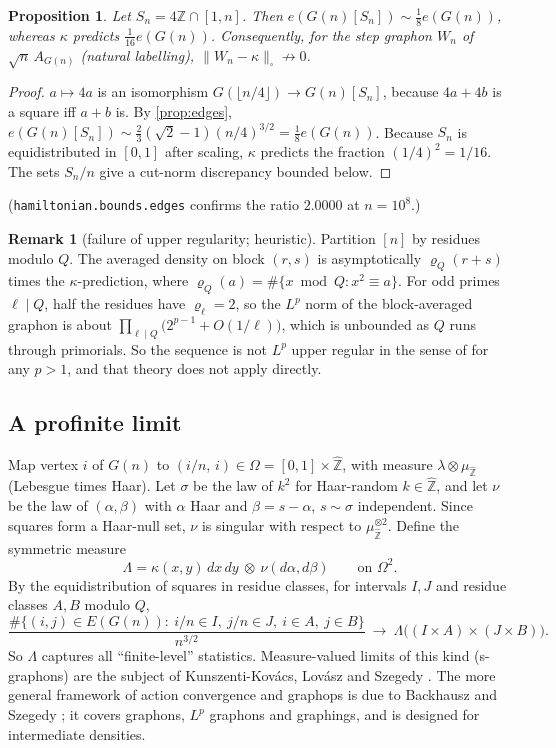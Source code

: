 \documentclass[11pt]{amsart}
\newtheorem{proposition}[theorem]{Proposition}
\theoremstyle{definition}
\newtheorem{remark}[theorem]{Remark}
\newcommand{\Zhat}{\widehat{\mathbb{Z}}}
\begin{document}
\begin{proposition}\label{prop:mod4}
Let $S_n=4\mathbb{Z}\cap[1,n]$. Then $e(G(n)[S_n])\sim\frac18 e(G(n))$, whereas
$\kappa$ predicts $\frac1{16}e(G(n))$. Consequently, for the step graphon $W_n$ of
$\sqrt n\,A_{G(n)}$ (natural labelling), $\|W_n-\kappa\|_\square\not\to0$.
\end{proposition}
\begin{proof}
$a\mapsto 4a$ is an isomorphism $G(\lfloor n/4\rfloor)\to G(n)[S_n]$, because
$4a+4b$ is a square iff $a+b$ is. By \cref{prop:edges},
$e(G(n)[S_n])\sim\frac23(\sqrt2-1)(n/4)^{3/2}=\frac18e(G(n))$. Because $S_n$ is
equidistributed in $[0,1]$ after scaling, $\kappa$ predicts the fraction
$(1/4)^2=1/16$. The sets $S_n/n$ give a cut-norm discrepancy bounded below.
\end{proof}
(\texttt{hamiltonian.bounds.edges} confirms the ratio $2.0000$ at $n=10^8$.)

\begin{remark}[failure of upper regularity; heuristic]
Partition $[n]$ by residues modulo $Q$. The averaged density on block $(r,s)$ is
asymptotically $\varrho_Q(r+s)$ times the $\kappa$-prediction, where
$\varrho_Q(a)=\#\{x\bmod Q:x^2\equiv a\}$. For odd primes $\ell\mid Q$, half the
residues have $\varrho_\ell=2$, so the $L^p$ norm of the block-averaged graphon is about
$\prod_{\ell\mid Q}\bigl(2^{p-1}+O(1/\ell)\bigr)$, which is unbounded as $Q$ runs
through primorials. So the sequence is not $L^p$ upper regular in the sense of
\cite{BCCZ1} for any $p>1$, and that theory does not apply directly.
\end{remark}

\subsection{A profinite limit}
Map vertex $i$ of $G(n)$ to $(i/n,\,i)\in\Omega=[0,1]\times\Zhat$, with measure
$\lambda\otimes\mu_{\Zhat}$ (Lebesgue times Haar). Let $\sigma$ be the law of $k^2$
for Haar-random $k\in\Zhat$, and let $\nu$ be the law of $(\alpha,\beta)$ with $\alpha$
Haar and $\beta=s-\alpha$, $s\sim\sigma$ independent. Since squares form a Haar-null
set, $\nu$ is singular with respect to $\mu_{\Zhat}^{\otimes2}$. Define the symmetric
measure
\[
\Lambda=\kappa(x,y)\,dx\,dy\ \otimes\ \nu(d\alpha,d\beta)\qquad\text{on }\Omega^2 .
\]
By the equidistribution of squares in residue classes, for intervals $I,J$ and residue
classes $A,B$ modulo $Q$,
\[
\frac{\#\{(i,j)\in E(G(n)):\ i/n\in I,\ j/n\in J,\ i\in A,\ j\in B\}}{n^{3/2}}
\ \longrightarrow\ \Lambda\bigl((I\times A)\times(J\times B)\bigr).
\]
So $\Lambda$ captures all ``finite-level'' statistics. Measure-valued limits of
this kind (s-graphons) are the subject of Kunszenti-Kov\'acs, Lov\'asz and Szegedy
\cite{KLS}. The more general framework of action convergence and graphops is due to
Backhausz and Szegedy \cite{BackhauszSzegedy}; it covers graphons, $L^p$ graphons and
graphings, and is designed for intermediate densities.
\end{document}
